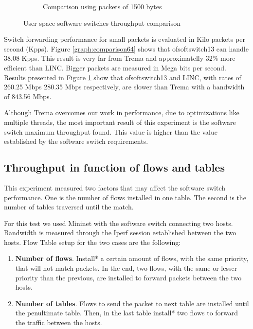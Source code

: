 \begin{figure}[H]
\begin{minipage}{\textwidth}
\begin{subfigure}{.7\textwidth}
            \caption{Comparison using packets of 1500 bytes}
            \label{graph:comparison1500}
        \end{subfigure}
        \end{minipage}
        \caption{User space software switches throughput comparison}
        \label{graph:comparison}
    \end{figure}
  
   Switch forwarding performance for small packets is evaluated in Kilo packets per second (Kpps). Figure \ref{graph:comparison64} shows that ofsoftswitch13 can handle 38.08 Kpps. This result is very 
   far from Trema and approximatelly 32\% more efficient than LINC. Bigger packets are measured in Mega bits per second. Results presented in Figure \ref{graph:comparison1500} show that ofsoftswitch13 and LINC, with rates of 260.25 Mbps 280.35 Mbps respectively, are slower than Trema with a bandwidth of 843.56 Mbps. 
   
    Although Trema overcomes our work in performance, due to optimizations like multiple threads, the most important result of this experiment is the software switch maximum throughput found. This value is higher than the value established by the software switch requirements. 
    
    \subsection{Throughput in function of flows and tables}
    \label{sec:bandflows}
    This experiment measured two factors that may affect the software switch performance. One is the number of flows installed in one table. The second is the number of tables traversed until the match.
    
    For this test we used Mininet with the software switch connecting two hosts. Bandwidth is measured through the  Iperf session established between the two hosts. Flow Table setup for the two cases are the following: 
    
    \begin{enumerate}[label=(\Alph*)]
    \item \textbf{Number of flows}. Install* a certain amount of flows, with the same priority, that will not match packets. In the end, two flows, with the same or lesser priority than the previous, are installed to forward packets between the two hosts.
    \item \textbf{Number of tables}. Flows to send the packet to next table are installed until the penultimate  table. Then, in the last table install* two flows to forward the traffic between the hosts.
    \end{enumerate}
    
